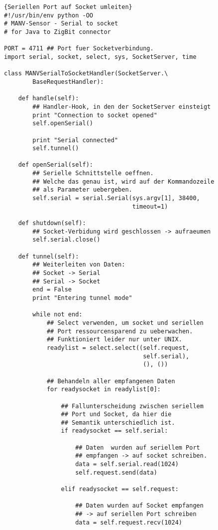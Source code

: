 \begin{lstlisting}{Seriellen Port auf Socket umleiten}
#!/usr/bin/env python -OO
# MANV-Sensor - Serial to socket
# for Java to ZigBit connector 

PORT = 4711 ## Port fuer Socketverbindung.
import serial, socket, select, sys, SocketServer, time

class MANVSerialToSocketHandler(SocketServer.\
        BaseRequestHandler):

    def handle(self):
        ## Handler-Hook, in den der SocketServer einsteigt
        print "Connection to socket opened"
        self.openSerial()

        print "Serial connected"
        self.tunnel()

    def openSerial(self):
        ## Serielle Schnittstelle oeffnen.
        ## Welche das genau ist, wird auf der Kommandozeile  
        ## als Parameter uebergeben.
        self.serial = serial.Serial(sys.argv[1], 38400, 
                                    timeout=1)

    def shutdown(self):
        ## Socket-Verbidung wird geschlossen -> aufraeumen
        self.serial.close()

    def tunnel(self):
        ## Weiterleiten von Daten:
        ## Socket -> Serial
        ## Serial -> Socket
        end = False
        print "Entering tunnel mode"

        while not end:
            ## Select verwenden, um socket und seriellen  
            ## Port ressourcensparend zu ueberwachen. 
            ## Funktioniert leider nur unter UNIX.
            readylist = select.select((self.request, 
                                       self.serial),
                                       (), ())

            ## Behandeln aller empfangenen Daten
            for readysocket in readylist[0]:

                ## Fallunterscheidung zwischen seriellem 
                ## Port und Socket, da hier die 
                ## Semantik unterschiedlich ist.
                if readysocket == self.serial:

                    ## Daten  wurden auf seriellem Port 
                    ## empfangen -> auf socket schreiben.
                    data = self.serial.read(1024)
                    self.request.send(data)

                elif readysocket == self.request:

                    ## Daten wurden auf Socket empfangen
                    ## -> auf seriellen Port schreiben
                    data = self.request.recv(1024)


\end{lstlisting}
